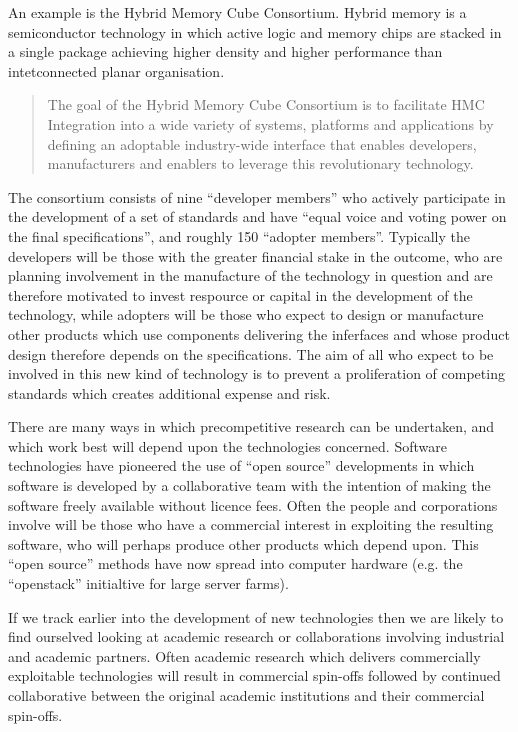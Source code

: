 An example is the Hybrid Memory Cube Consortium.
Hybrid memory is a semiconductor technology in which active logic and memory chips are stacked in a single package
achieving higher density and higher performance than intetconnected planar organisation.

\begin{quote}
The goal of the Hybrid Memory Cube Consortium is to facilitate HMC Integration into a wide variety of systems, platforms and applications by defining an adoptable industry-wide interface that enables developers, manufacturers and enablers to leverage this revolutionary technology.
\end{quote}

The consortium consists of nine ``developer members'' who actively participate in the development of a set of standards and have ``equal voice and voting power on the final specifications'', and roughly 150 ``adopter members''.
Typically the developers will be those with the greater financial stake in the outcome, who are planning involvement in the manufacture of the technology in question and are therefore motivated to invest respource or capital in the development of the technology, while adopters will be those who expect to design or manufacture other products which use components delivering the inferfaces and whose product design therefore depends on the specifications.
The aim of all who expect to be involved in this new kind of technology is to prevent a proliferation of competing standards which creates additional expense and risk.

There are many ways in which precompetitive research can be undertaken, and which work best will depend upon the technologies concerned.
Software technologies have pioneered the use of ``open source'' developments in which software is developed by a collaborative team
with the intention of making the software freely available without licence fees.
Often the people and corporations involve will be those who have a commercial interest in exploiting the resulting software, who will perhaps produce other products which depend upon.
This ``open source'' methods have now spread into computer hardware (e.g. the ``openstack'' initialtive for large server farms).

If we track earlier into the development of new technologies then we are likely to find ourselved looking at academic research or collaborations involving industrial and academic partners.
Often academic research which delivers commercially exploitable technologies will result in commercial spin-offs followed by continued collaborative between the original academic institutions and their commercial spin-offs.


